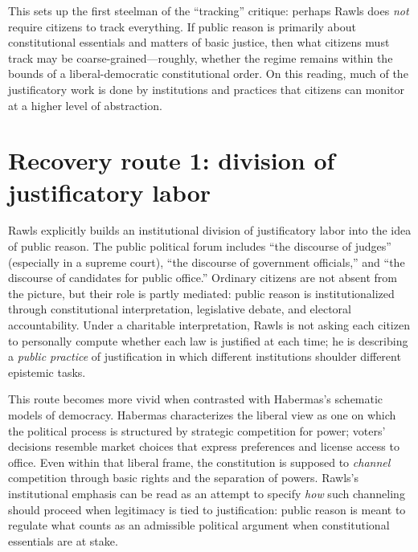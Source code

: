 \documentclass[12pt]{report}
\begin{document}
This sets up the first steelman of the ``tracking'' critique: perhaps Rawls does \emph{not} require citizens to track everything. If public reason is primarily about constitutional essentials and matters of basic justice, then what citizens must track may be coarse-grained---roughly, whether the regime remains within the bounds of a liberal-democratic constitutional order. \parencite[pp.~767--768]{rawls1997public} On this reading, much of the justificatory work is done by institutions and practices that citizens can monitor at a higher level of abstraction.

\section{Recovery route 1: division of justificatory labor}

Rawls explicitly builds an institutional division of justificatory labor into the idea of public reason. The public political forum includes ``the discourse of judges'' (especially in a supreme court), ``the discourse of government officials,'' and ``the discourse of candidates for public office.'' \parencite[p.~767]{rawls1997public} Ordinary citizens are not absent from the picture, but their role is partly mediated: public reason is institutionalized through constitutional interpretation, legislative debate, and electoral accountability. \parencite[pp.~767--768]{rawls1997public} Under a charitable interpretation, Rawls is not asking each citizen to personally compute whether each law is justified at each time; he is describing a \emph{public practice} of justification in which different institutions shoulder different epistemic tasks.

This route becomes more vivid when contrasted with Habermas’s schematic models of democracy. Habermas characterizes the liberal view as one on which the political process is structured by strategic competition for power; voters’ decisions resemble market choices that express preferences and license access to office. \parencite[p.~3]{habermas1994three} Even within that liberal frame, the constitution is supposed to \emph{channel} competition through basic rights and the separation of powers. \parencite[p.~7]{habermas1994three} Rawls’s institutional emphasis can be read as an attempt to specify \emph{how} such channeling should proceed when legitimacy is tied to justification: public reason is meant to regulate what counts as an admissible political argument when constitutional essentials are at stake. \parencite[pp.~767--768]{rawls1997public}
\end{document}
